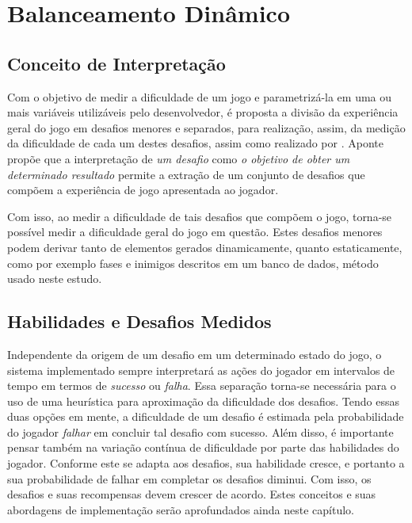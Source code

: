 
\chapter{Balanceamento Dinâmico}
\label{cap:balanceamento dinamico}
\section{Conceito de Interpretação}

Com o objetivo de medir a dificuldade de um jogo e parametrizá-la em uma ou mais variáveis utilizáveis pelo desenvolvedor, é proposta a divisão da experiência geral do jogo em desafios menores e separados, para realização, assim, da medição da dificuldade de cada um destes desafios, assim como realizado por \citet{ExperimentalValidation}. Aponte propõe que a interpretação de \emph{um desafio} como \emph{o objetivo de obter um determinado resultado} permite a extração de um conjunto de desafios que compõem a experiência de jogo apresentada ao jogador.

Com isso, ao medir a dificuldade de tais desafios que compõem o jogo, torna-se possível medir a dificuldade geral do jogo em questão. Estes desafios menores podem derivar tanto de elementos gerados dinamicamente, quanto estaticamente, como por exemplo fases e inimigos descritos em um banco de dados, método usado neste estudo.

\section{Habilidades e Desafios Medidos}

Independente da origem de um desafio em um determinado estado do jogo, o sistema implementado sempre interpretará as ações do jogador em intervalos de tempo em termos de \textit{sucesso} ou \textit{falha}. Essa separação torna-se necessária para o uso de uma heurística para aproximação da dificuldade dos desafios. Tendo essas duas opções em mente, a dificuldade de um desafio é estimada pela probabilidade do jogador \textit{falhar} em concluir tal desafio com sucesso. Além disso, é importante pensar também na variação contínua de dificuldade por parte das habilidades do jogador. Conforme este se adapta aos desafios, sua habilidade cresce, e portanto a sua probabilidade de falhar em completar os desafios diminui. Com isso, os desafios e suas recompensas devem crescer de acordo. Estes conceitos e suas abordagens de implementação serão aprofundados ainda neste capítulo.

